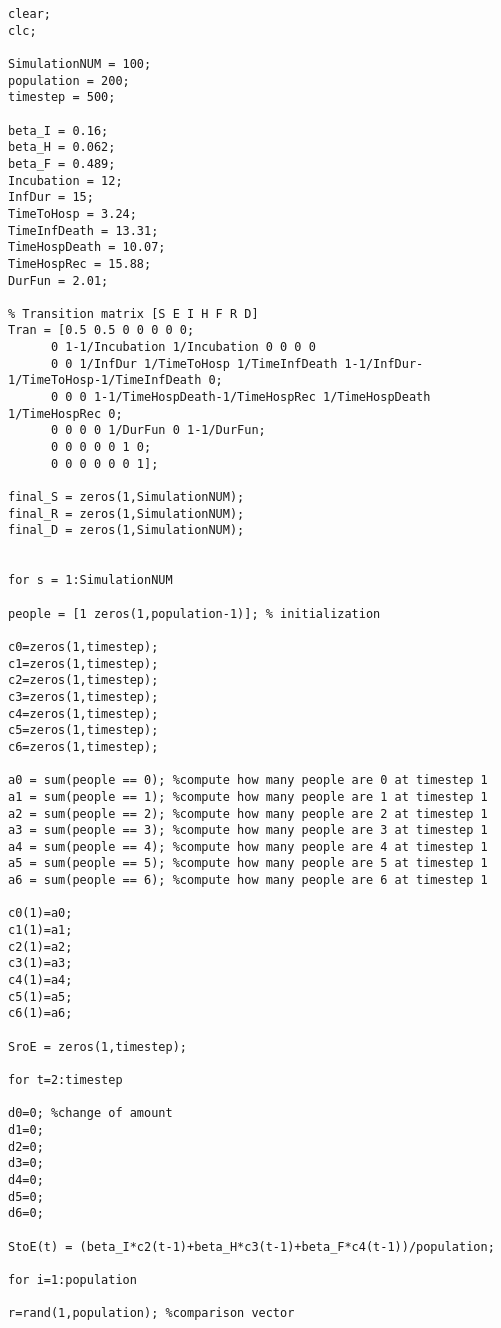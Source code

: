 \begin{verbatim}
clear;
clc;

SimulationNUM = 100;
population = 200;
timestep = 500;

beta_I = 0.16;
beta_H = 0.062;
beta_F = 0.489;
Incubation = 12;
InfDur = 15;
TimeToHosp = 3.24;
TimeInfDeath = 13.31;
TimeHospDeath = 10.07;
TimeHospRec = 15.88;
DurFun = 2.01;

% Transition matrix [S E I H F R D]
Tran = [0.5 0.5 0 0 0 0 0; 
      0 1-1/Incubation 1/Incubation 0 0 0 0
      0 0 1/InfDur 1/TimeToHosp 1/TimeInfDeath 1-1/InfDur-1/TimeToHosp-1/TimeInfDeath 0; 
      0 0 0 1-1/TimeHospDeath-1/TimeHospRec 1/TimeHospDeath 1/TimeHospRec 0; 
      0 0 0 0 1/DurFun 0 1-1/DurFun; 
      0 0 0 0 0 1 0; 
      0 0 0 0 0 0 1];

final_S = zeros(1,SimulationNUM);
final_R = zeros(1,SimulationNUM);
final_D = zeros(1,SimulationNUM);


for s = 1:SimulationNUM

people = [1 zeros(1,population-1)]; % initialization 

c0=zeros(1,timestep);
c1=zeros(1,timestep);
c2=zeros(1,timestep);
c3=zeros(1,timestep);
c4=zeros(1,timestep);
c5=zeros(1,timestep);
c6=zeros(1,timestep);

a0 = sum(people == 0); %compute how many people are 0 at timestep 1
a1 = sum(people == 1); %compute how many people are 1 at timestep 1
a2 = sum(people == 2); %compute how many people are 2 at timestep 1
a3 = sum(people == 3); %compute how many people are 3 at timestep 1
a4 = sum(people == 4); %compute how many people are 4 at timestep 1
a5 = sum(people == 5); %compute how many people are 5 at timestep 1
a6 = sum(people == 6); %compute how many people are 6 at timestep 1

c0(1)=a0;
c1(1)=a1;
c2(1)=a2;
c3(1)=a3;
c4(1)=a4;
c5(1)=a5;
c6(1)=a6;

SroE = zeros(1,timestep);

for t=2:timestep

d0=0; %change of amount
d1=0;
d2=0;
d3=0;
d4=0;
d5=0;
d6=0;    
    
StoE(t) = (beta_I*c2(t-1)+beta_H*c3(t-1)+beta_F*c4(t-1))/population;

for i=1:population
    
r=rand(1,population); %comparison vector
    

\end{verbatim}
